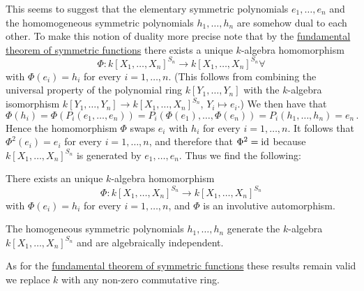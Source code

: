 \begin{fluff}
  This seems to suggest that the elementary symmetric polynomials $e_1, \dotsc, e_n$ and the homomogeneous symmetric polynomials $h_1, \dotsc, h_n$ are somehow dual to each other.
  To make this notion of duality more precise note that by the \hyperref[theorem: fundamental theorem of symmetric functions]{fundamental theorem of symmetric functions} there exists a unique $k$-algebra homomorphism
  \[
            \Phi
    \colon  k[X_1, \dotsc, X_n]^{S_n}
    \to     k[X_1, \dotsc, X_n]^{S_n}∀
  \]
  with $\Phi(e_i) = h_i$ for every $i = 1, \dotsc, n$.
  (This follows from combining the universal property of the polynomial ring $k[Y_1, \dotsc, Y_n]$ with the $k$-algebra isomorphism $k[Y_1, \dotsc, Y_n] \to k[X_1, \dotsc, X_n]^{S_n}$, $Y_i \mapsto e_i$.)
  We then have that
  \[
      \Phi(h_i)
    = \Phi( P_i(e_1, \dotsc, e_n) )
    = P_i( \Phi(e_1), \dotsc, \Phi(e_n) )
    = P_i( h_1, \dotsc, h_n )
    = e_n \,.
  \]
  Hence the homomorphism $\Phi$ swaps $e_i$ with $h_i$ for every $i = 1, \dotsc, n$.
  It follows that $\Phi^2(e_i) = e_i$ for every $i = 1, \dotsc, n$, and therefore that $\Phi^2 = \operatorname{id}$ because $k[X_1, \dotsc, X_n]^{S_n}$ is generated by $e_1, \dotsc, e_n$.
  Thus we find the following:
\end{fluff}

\begin{corollary}
  There exists an unique $k$-algebra homomorphism
  \[
            \Phi
    \colon  k[X_1, \dotsc, X_n]^{S_n}
    \to     k[X_1, \dotsc, X_n]^{S_n}
  \]
  with $\Phi(e_i) = h_i$ for every $i = 1, \dotsc, n$, and $\Phi$ is an involutive automorphism.
\end{corollary}


\begin{corollary}
  The homogeneous symmetric polynomials $h_1, \dotsc, h_n$ generate the $k$-algebra $k[X_1, \dotsc, X_n]^{S_n}$ and are algebraically independent.
\end{corollary}


\begin{remark}
  As for the \hyperref[theorem: fundamental theorem of symmetric functions]{fundamental theorem of symmetric functions} these results remain valid we replace $k$ with any non-zero commutative ring.
\end{remark}




